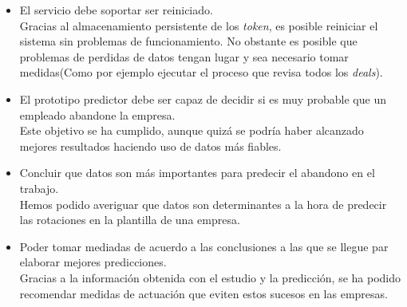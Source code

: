 \begin{itemize}
	\item El servicio debe soportar ser reiniciado.\\
	
	Gracias al almacenamiento persistente de los \textit{token}, es posible reiniciar el sistema sin problemas de funcionamiento. No obstante es posible que problemas de perdidas de datos tengan lugar y sea necesario tomar medidas(Como por ejemplo ejecutar el proceso que revisa todos los \textit{deals}).
	\item El prototipo predictor debe ser capaz de decidir si es muy probable que un empleado abandone la empresa.\\
	
	Este objetivo se ha cumplido, aunque quizá se podría haber alcanzado mejores resultados haciendo uso de datos más fiables.
	\item Concluir que datos son más importantes para predecir el abandono en el trabajo.\\
	
	Hemos podido averiguar que datos son determinantes a la hora de predecir las rotaciones en la plantilla de una empresa.
	\item Poder tomar mediadas de acuerdo a las conclusiones a las que se llegue par elaborar mejores predicciones.\\
	
	Gracias a la información obtenida con el estudio y la predicción, se ha podido recomendar medidas de actuación que eviten estos sucesos en las empresas.
\end{itemize}




